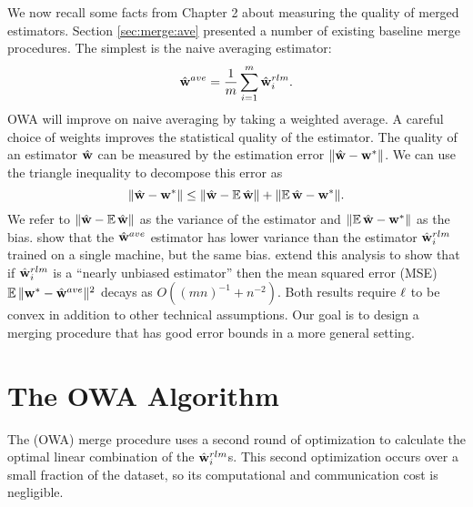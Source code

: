 \documentclass[thesis.tex]{subfiles}
\begin{document}
We now recall some facts from Chapter 2 about measuring the quality of merged estimators.
Section \ref{sec:merge:ave} presented a number of existing baseline merge procedures.
The simplest is the naive averaging estimator:
\begin{equation}
\hat{\mathbf w}^{ave} = \frac{1}{m}\sum_{i=1}^m \hat{\mathbf w}^{rlm}_i
.
\end{equation}
OWA will improve on naive averaging by taking a weighted average.
A careful choice of weights improves the statistical quality of the estimator.
The quality of an estimator ${\hat{\mathbf w}}$ can be measured by the estimation error ${\lVert {{\hat{\mathbf w}}-{\mathbf w^{*}}} \rVert}$. 
We can use the triangle inequality to decompose this error as
\begin{equation}
{\lVert {{\hat{\mathbf w}}-{\mathbf w^{*}}} \rVert} \le {\lVert {{\hat{\mathbf w}}-\operatorname*{\mathbb E}{\hat{\mathbf w}}} \rVert}+ {\lVert {\operatorname*{\mathbb E}{\hat{\mathbf w}}- {\mathbf w^{*}}} \rVert} .
\end{equation}
We refer to ${\lVert {{\hat{\mathbf w}}-\operatorname*{\mathbb E}{\hat{\mathbf w}}} \rVert}$ as the variance of the estimator and ${\lVert {\operatorname*{\mathbb E}{\hat{\mathbf w}}-{\mathbf w^{*}}} \rVert}$ as the bias.
\citet{mcdonald2009efficient} show that the $\hat{\mathbf w}^{ave}$ estimator has lower variance than the estimator $\hat{\mathbf w}^{rlm}_i$ trained on a single machine, but the same bias.
\citet{zhang2012communication} extend this analysis to show that if $\hat{\mathbf w}^{rlm}_i$ is a ``nearly unbiased estimator'' then the mean squared error (MSE) $\operatorname*{\mathbb E}{\lVert {{\mathbf w^{*}}-\hat{\mathbf w}^{ave}} \rVert}{}^2$ decays as $O((mn)^{-1} + n^{-2})$.
Both results require $\ell$ to be convex in addition to other technical assumptions.
Our goal is to design a merging procedure that has good error bounds in a more general setting.


\section{The  OWA Algorithm}
\label{sec:owa:alg}

The  (OWA) merge procedure uses a second round of optimization to calculate the optimal linear combination of the $\hat{\mathbf w}^{rlm}_i$s.
This second optimization occurs over a small fraction of the dataset,
so its computational and communication cost is negligible.
\end{document}
